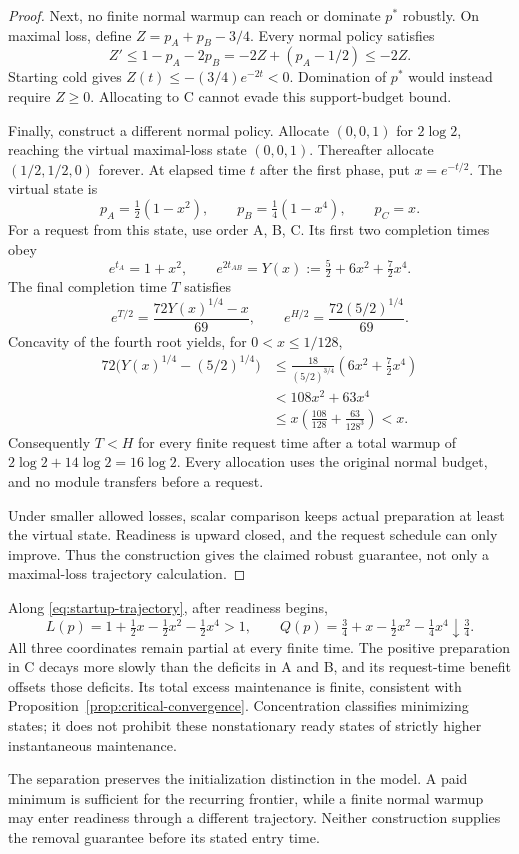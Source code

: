 \begin{proof}
Next, no finite normal warmup can reach or dominate $p^*$ robustly.
On maximal loss, define $Z=p_A+p_B-3/4$. Every normal policy satisfies
\[
 Z'\leq1-p_A-2p_B=-2Z+(p_A-1/2)\leq-2Z.
\]
Starting cold gives $Z(t)\leq-(3/4)e^{-2t}<0$. Domination of $p^*$ would
instead require $Z\geq0$. Allocating to C cannot evade this support-budget
bound.

Finally, construct a different normal policy. Allocate $(0,0,1)$ for
$2\log2$, reaching the virtual maximal-loss state $(0,0,1)$. Thereafter
allocate $(1/2,1/2,0)$ forever. At elapsed time $t$ after the first phase,
put $x=e^{-t/2}$. The virtual state is
\begin{equation}
 p_A=\tfrac12(1-x^2),\qquad
 p_B=\tfrac14(1-x^4),\qquad p_C=x.
 \label{eq:startup-trajectory}
\end{equation}
For a request from this state, use order A, B, C. Its first two completion
times obey
\[
 e^{t_A}=1+x^2,\qquad
 e^{2t_{AB}}=Y(x):=\tfrac52+6x^2+\tfrac72x^4.
\]
The final completion time $T$ satisfies
\[
 e^{T/2}=\frac{72Y(x)^{1/4}-x}{69},\qquad
 e^{H/2}=\frac{72(5/2)^{1/4}}{69}.
\]
Concavity of the fourth root yields, for $0<x\leq1/128$,
\begin{align*}
 72\bigl(Y(x)^{1/4}-(5/2)^{1/4}\bigr)
 &\leq \frac{18}{(5/2)^{3/4}}\left(6x^2+\tfrac72x^4\right)\\
 &<108x^2+63x^4\\
 &\leq x\left(\frac{108}{128}+\frac{63}{128^3}\right)<x.
\end{align*}
Consequently $T<H$ for every finite request time after a total warmup of
$2\log2+14\log2=16\log2$. Every allocation uses the original normal
budget, and no module transfers before a request.

Under smaller allowed losses, scalar comparison keeps actual preparation
at least the virtual state. Readiness is upward closed, and the request
schedule can only improve. Thus the construction gives the claimed robust
guarantee, not only a maximal-loss trajectory calculation.
\end{proof}

Along \eqref{eq:startup-trajectory}, after readiness begins,
\[
 L(p)=1+\tfrac12x-\tfrac12x^2-\tfrac12x^4>1,\qquad
 Q(p)=\tfrac34+x-\tfrac12x^2-\tfrac14x^4\downarrow\tfrac34.
\]
All three coordinates remain partial at every finite time. The positive
preparation in C decays more slowly than the deficits in A and B, and its
request-time benefit offsets those deficits. Its total excess maintenance
is finite, consistent with Proposition~\ref{prop:critical-convergence}.
Concentration classifies minimizing states; it does not prohibit these
nonstationary ready states of strictly higher instantaneous maintenance.

The separation preserves the initialization distinction in the model. A
paid minimum is sufficient for the recurring frontier, while a finite
normal warmup may enter readiness through a different trajectory. Neither
construction supplies the removal guarantee before its stated entry time.
